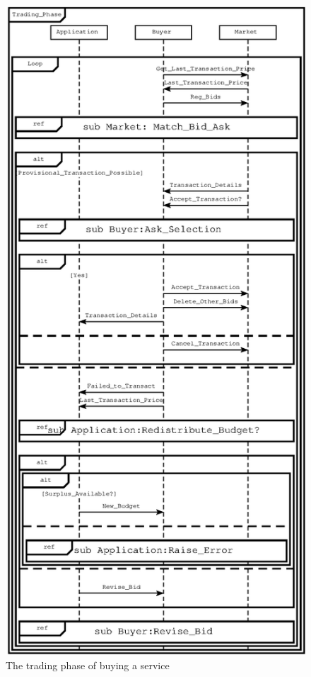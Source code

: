 \documentclass[10pt,journal,compsoc]{IEEEtran}
\begin{document}
\begin{figure}[h]
\centering
\includegraphics[scale=0.8]{Figure26.eps}
\caption{The trading phase of buying a service \label{fig:trading_phase}}
\end{figure}
\end{document}
